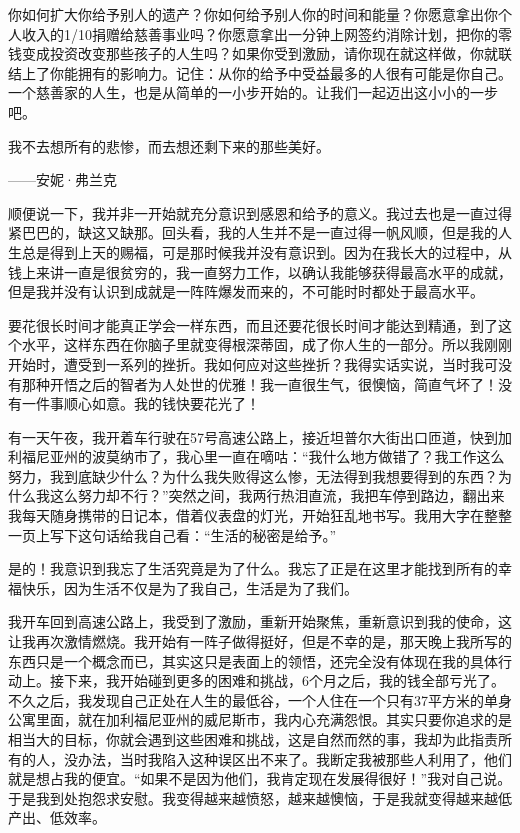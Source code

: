 你如何扩大你给予别人的遗产？你如何给予别人你的时间和能量？你愿意拿出你个人收入的1/10捐赠给慈善事业吗？你愿意拿出一分钟上网签约消除计划，把你的零钱变成投资改变那些孩子的人生吗？如果你受到激励，请你现在就这样做，你就联结上了你能拥有的影响力。记住：从你的给予中受益最多的人很有可能是你自己。一个慈善家的人生，也是从简单的一小步开始的。让我们一起迈出这小小的一步吧。

\begin{BookQuote}
我不去想所有的悲惨，而去想还剩下来的那些美好。

\hfill ——安妮·弗兰克
\end{BookQuote}

顺便说一下，我并非一开始就充分意识到感恩和给予的意义。我过去也是一直过得紧巴巴的，缺这又缺那。回头看，我的人生并不是一直过得一帆风顺，但是我的人生总是得到上天的赐福，可是那时候我并没有意识到。因为在我长大的过程中，从钱上来讲一直是很贫穷的，我一直努力工作，以确认我能够获得最高水平的成就，但是我并没有认识到成就是一阵阵爆发而来的，不可能时时都处于最高水平。

要花很长时间才能真正学会一样东西，而且还要花很长时间才能达到精通，到了这个水平，这样东西在你脑子里就变得根深蒂固，成了你人生的一部分。所以我刚刚开始时，遭受到一系列的挫折。我如何应对这些挫折？我得实话实说，当时我可没有那种开悟之后的智者为人处世的优雅！我一直很生气，很懊恼，简直气坏了！没有一件事顺心如意。我的钱快要花光了！

有一天午夜，我开着车行驶在57号高速公路上，接近坦普尔大街出口匝道，快到加利福尼亚州的波莫纳市了，我心里一直在嘀咕：“我什么地方做错了？我工作这么努力，我到底缺少什么？为什么我失败得这么惨，无法得到我想要得到的东西？为什么我这么努力却不行？”突然之间，我两行热泪直流，我把车停到路边，翻出来我每天随身携带的日记本，借着仪表盘的灯光，开始狂乱地书写。我用大字在整整一页上写下这句话给我自己看：“生活的秘密是给予。”

是的！我意识到我忘了生活究竟是为了什么。我忘了正是在这里才能找到所有的幸福快乐，因为生活不仅是为了我自己，生活是为了我们。

我开车回到高速公路上，我受到了激励，重新开始聚焦，重新意识到我的使命，这让我再次激情燃烧。我开始有一阵子做得挺好，但是不幸的是，那天晚上我所写的东西只是一个概念而已，其实这只是表面上的领悟，还完全没有体现在我的具体行动上。接下来，我开始碰到更多的困难和挑战，6个月之后，我的钱全部亏光了。不久之后，我发现自己正处在人生的最低谷，一个人住在一个只有37平方米的单身公寓里面，就在加利福尼亚州的威尼斯市，我内心充满怨恨。其实只要你追求的是相当大的目标，你就会遇到这些困难和挑战，这是自然而然的事，我却为此指责所有的人，没办法，当时我陷入这种误区出不来了。我断定我被那些人利用了，他们就是想占我的便宜。“如果不是因为他们，我肯定现在发展得很好！”我对自己说。于是我到处抱怨求安慰。我变得越来越愤怒，越来越懊恼，于是我就变得越来越低产出、低效率。

